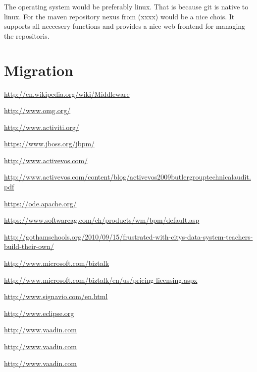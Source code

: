 \documentclass[paper=a4,twoside=false,BCOR=0mm,DIV=calc,fontsize=12pt]{scrartcl}
\begin{document}
The operating system would be preferably linux. That is because git is native to linux.
For the maven repository nexus from (xxxx) would be a nice chois. It supports all neccesery functions and provides a nice web frontend for managing the repositoris.






\section{Migration}








\begin{thebibliography}{99}

 \url{http://en.wikipedia.org/wiki/Middleware}

 \url{http://www.omg.org/}

 \url{http://www.activiti.org/}

 \url{https://www.jboss.org/jbpm/}

 \url{http://www.activevos.com/}

 \url{http://www.activevos.com/content/blog/activevos2009butlergrouptechnicalaudit.pdf}

 \url{https://ode.apache.org/}

 \url{https://www.softwareag.com/ch/products/wm/bpm/default.asp}

 \url{http://gothamschools.org/2010/09/15/frustrated-with-citys-data-system-teachers-build-their-own/}

 \url{http://www.microsoft.com/biztalk}

 \url{http://www.microsoft.com/biztalk/en/us/pricing-licensing.aspx}

 \url{http://www.signavio.com/en.html}

 \url{http://www.eclipse.org} %

 \url{http://www.vaadin.com}

 \url{http://www.vaadin.com}

 \url{http://www.vaadin.com}


\end{thebibliography}
\end{document}
